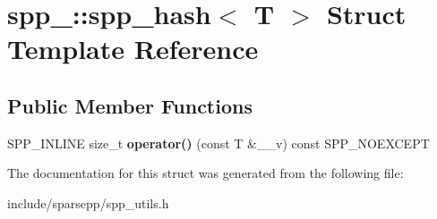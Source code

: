 \hypertarget{structspp___1_1spp__hash}{}\section{spp\+\_\+\+:\+:spp\+\_\+hash$<$ T $>$ Struct Template Reference}
\label{structspp___1_1spp__hash}
\subsection*{Public Member Functions}
\begin{DoxyCompactItemize}
\item 
S\+P\+P\+\_\+\+I\+N\+L\+I\+NE size\+\_\+t {\bfseries operator()} (const T \&\+\_\+\+\_\+v) const S\+P\+P\+\_\+\+N\+O\+E\+X\+C\+E\+PT\hypertarget{structspp___1_1spp__hash_abd6f89ad97a19e0a692bbdbc096960b1}{}\label{structspp___1_1spp__hash_abd6f89ad97a19e0a692bbdbc096960b1}

\end{DoxyCompactItemize}


The documentation for this struct was generated from the following file\+:\begin{DoxyCompactItemize}
\item 
include/sparsepp/spp\+\_\+utils.\+h\end{DoxyCompactItemize}
